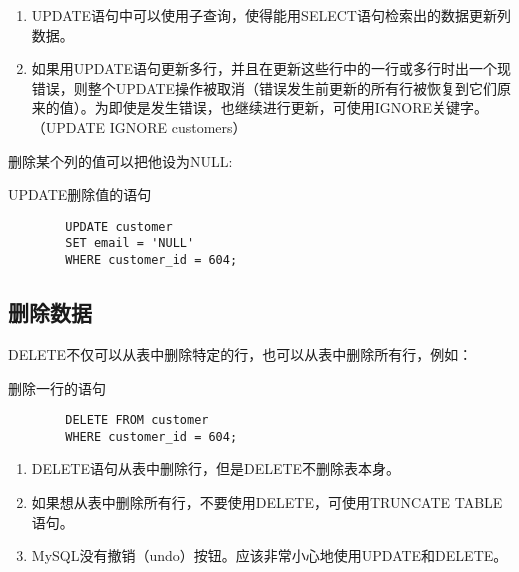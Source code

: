 \documentclass[UTF8]{article}
\begin{document}
\begin{orangebox}[frametitle={Tips 20.1.1 UPDATE的注意事项}]
        \begin{enumerate}
                \item UPDATE语句中可以使用子查询，使得能用SELECT语句检索出的数据更新列数据。
                \item 如果用UPDATE语句更新多行，并且在更新这些行中的一行或多行时出一个现错误，则整个UPDATE操作被取消（错误发生前更新的所有行被恢复到它们原来的值）。为即使是发生错误，也继续进行更新，可使用IGNORE关键字。（UPDATE IGNORE customers）
        \end{enumerate}
\end{orangebox}


删除某个列的值可以把他设为NULL:
\begin{listing}[H]
        \caption{UPDATE删除值的语句}
	\label{code:updatedeleteclause}
\begin{verbatim}
        UPDATE customer
        SET email = 'NULL'
        WHERE customer_id = 604;
\end{verbatim}
\end{listing}

\subsection{删除数据}

DELETE不仅可以从表中删除特定的行，也可以从表中删除所有行，例如：

\begin{listing}[H]
        \caption{删除一行的语句}
	\label{code:deleterowclause}
\begin{verbatim}
        DELETE FROM customer
        WHERE customer_id = 604;
\end{verbatim}
\end{listing}

\begin{orangebox}[frametitle={Tips 20.2.1 DELETE的注意事项}]
        \begin{enumerate}
                \item DELETE语句从表中删除行，但是DELETE不删除表本身。
                \item 如果想从表中删除所有行，不要使用DELETE，可使用TRUNCATE TABLE语句。
                \item MySQL没有撤销（undo）按钮。应该非常小心地使用UPDATE和DELETE。
        \end{enumerate}
\end{orangebox}
\end{document}
